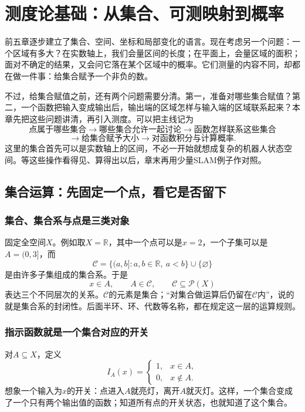 \chapter{测度论基础：从集合、可测映射到概率}
\label{chap:md-07}
\label{chap:measure-foundations}
\label{chap:probability-geometry}

前五章逐步建立了集合、空间、坐标和局部变化的语言。现在考虑另一个问题：一个区域有多大？在实数轴上，我们会量区间的长度；在平面上，会量区域的面积；面对不确定的结果，又会问它落在某个区域中的概率。它们测量的内容不同，却都在做一件事：给集合赋予一个非负的数。

不过，给集合赋值之前，还有两个问题需要分清。第一，准备对哪些集合赋值？第二，一个函数把输入变成输出后，输出端的区域怎样与输入端的区域联系起来？本章先把这些问题讲清，再引入测度。可以把主线记为
\[
 \text{点属于哪些集合}
 \longrightarrow\text{哪些集合允许一起讨论}
 \longrightarrow\text{函数怎样联系这些集合}
\]
\[
 \longrightarrow\text{给集合赋予大小}
 \longrightarrow\text{对函数积分与计算概率}.
\]
这里的集合首先可以是实数轴上的区间，不必一开始就想成复杂的机器人状态空间。等这些操作看得见、算得出以后，章末再用少量SLAM例子作对照。

\section{集合运算：先固定一个点，看它是否留下}

\subsection{集合、集合系与点是三类对象}

固定全空间$X$。例如取$X=\mathbb R$，其中一个点可以是$x=2$，一个子集可以是$A=(0,3]$，而
\[
 \mathcal C=\{(a,b]:a,b\in\mathbb R,\ a<b\}\cup\{\varnothing\}
\]
是由许多子集组成的集合系。于是
\[
 x\in A,\qquad A\in\mathcal C,\qquad
 \mathcal C\subseteq\mathcal P(X)
\]
表达三个不同层次的关系。$\mathcal C$的元素是集合；“对集合做运算后仍留在$\mathcal C$内”，说的就是集合系的封闭性。后面半环、环、代数等名称，都在规定这一层的运算规则。

\subsection{指示函数就是一个集合对应的开关}

对$A\subseteq X$，定义
\[
 I_A(x)=\begin{cases}1,&x\in A,\\0,&x\notin A.\end{cases}
\]
想象一个输入为$x$的开关：点进入$A$就亮灯，离开$A$就灭灯。这样，一个集合变成了一个只有两个输出值的函数；知道所有点的开关状态，也就知道了这个集合。

